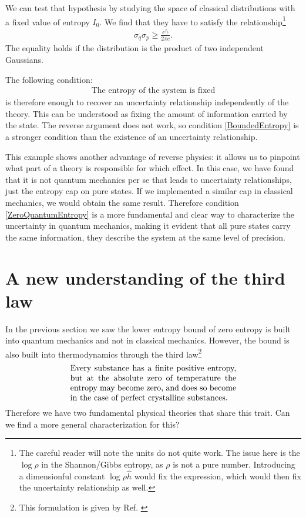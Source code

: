 \documentclass[10pt,twocolumn, nofootinbib]{revtex4-2}
\begin{document}
We can test that hypothesis by studying the space of classical distributions with a fixed value of entropy $I_0$. We find that they have to satisfy the relationship\footnote{The careful reader will note the units do not quite work. The issue here is the $\log \rho$ in the Shannon/Gibbs entropy, as $\rho$ is not a pure number. Introducing a dimensionful constant $\log \rho \hat{h}$ would fix the expression, which would then fix the uncertainty relationship as well. }
\begin{align}\label{ClassicalUncertaintyPrinciple}
	\sigma_q \sigma_p \geq \frac{e^{I_0}}{2 \pi e}.
\end{align}
The equality holds if the distribution is the product of two independent Gaussians.

The following condition:
\begin{align}\label{BoundedEntropy}
	\text{The entropy of the system is fixed}
\end{align}
is therefore enough to recover an uncertainty relationship independently of the theory. This can be understood as fixing the amount of information carried by the state. The reverse argument does not work, so condition \eqref{BoundedEntropy} is a stronger condition than the existence of an uncertainty relationship.

This example shows another advantage of reverse physics: it allows us to pinpoint what part of a theory is responsible for which effect. In this case, we have found that it is not quantum mechanics per se that leads to uncertainty relationships, just the entropy cap on pure states. If we implemented a similar cap in classical mechanics, we would obtain the same result. Therefore condition \eqref{ZeroQuantumEntropy} is a more fundamental and clear way to characterize the uncertainty in quantum mechanics, making it evident that all pure states carry the same information, they describe the system at the same level of precision.


\section{A new understanding of the third law}

In the previous section we saw the lower entropy bound of zero entropy is built into quantum mechanics and not in classical mechanics. However, the bound is also built into thermodynamics through the third law\footnote{This formulation is given by Ref. \cite{lewis1923thermodynamics}}
\begin{align}\label{ThirdLaw}
	\parbox{2.8in}{Every substance has a finite positive entropy, but
		at the absolute zero of temperature the entropy may become zero, and does so
		become in the case of perfect crystalline substances.}
\end{align}
Therefore we have two fundamental physical theories that share this trait. Can we find a more general characterization for this?
\end{document}
